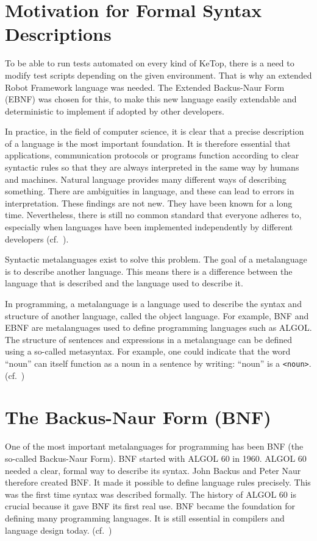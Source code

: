 \section{Motivation for Formal Syntax Descriptions}

To be able to run tests automated on every kind of KeTop, there is a need to modify test scripts depending on the given environment. That is why an extended Robot Framework language was needed. The Extended Backus-Naur Form (EBNF) was chosen for this, to make this new language easily extendable and deterministic to implement if adopted by other developers.

In practice, in the field of computer science, it is clear that a precise description of a language is the most important foundation. It is therefore essential that applications, communication protocols or programs function according to clear syntactic rules so that they are always interpreted in the same way by humans and machines. Natural language provides many different ways of describing something. There are ambiguities in language, and these can lead to errors in interpretation. These findings are not new. They have been known for a long time. Nevertheless, there is still no common standard that everyone adheres to, especially when languages have been implemented independently by different developers (cf.~\cite[p.~V]{ISO/IEC149771996InformationBNF}).

Syntactic metalanguages exist to solve this problem. The goal of a metalanguage is to describe another language. This means there is a difference between the language that is described and the language used to describe it.

In programming, a metalanguage is a language used to describe the syntax and structure of another language, called the object language. For example, BNF and EBNF are metalanguages used to define programming languages such as ALGOL. The structure of sentences and expressions in a metalanguage can be defined using a so-called metasyntax. For example, one could indicate that the word ``noun'' can itself function as a noun in a sentence by writing: ``noun'' is a \texttt{<noun>}. (cf.~\cite{WikipediaMetalanguage})


\section{The Backus-Naur Form (BNF)}

One of the most important metalanguages for programming has been BNF (the so-called Backus-Naur Form). BNF started with ALGOL 60 in 1960. ALGOL 60 needed a clear, formal way to describe its syntax. John Backus and Peter Naur therefore created BNF. It made it possible to define language rules precisely. This was the first time syntax was described formally. The history of ALGOL 60 is crucial because it gave BNF its first real use. BNF became the foundation for defining many programming languages. It is still essential in compilers and language design today. (cf.~\cite[ p.~3]{Mossenbock2025})

